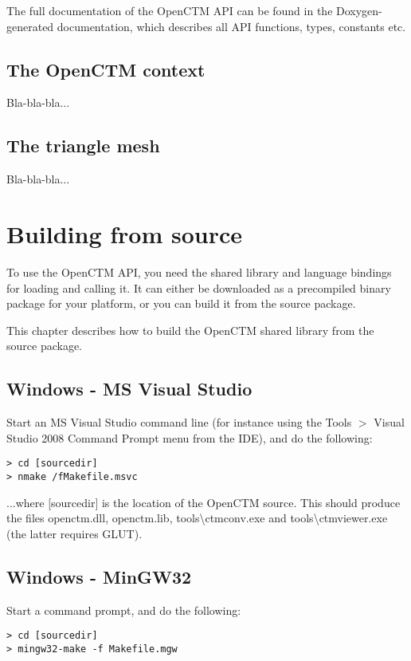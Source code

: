 The full documentation of the OpenCTM API can be found in the Doxygen-generated
documentation, which describes all API functions, types, constants etc.


\section{The OpenCTM context}
Bla-bla-bla...


\section{The triangle mesh}
Bla-bla-bla...




\chapter{Building from source}
To use the OpenCTM API, you need the shared library and language bindings
for loading and calling it. It can either be downloaded as a precompiled binary
package for your platform, or you can build it from the source package.

This chapter describes how to build the OpenCTM shared library from the source
package.

\section{Windows - MS Visual Studio}
Start an MS Visual Studio command line (for instance using the Tools $>$
Visual Studio 2008 Command Prompt menu from the IDE), and do the following:

\begin{lstlisting}
> cd [sourcedir]
> nmake /fMakefile.msvc
\end{lstlisting}

...where [sourcedir] is the location of the OpenCTM source. This should produce
the files openctm.dll, openctm.lib, tools\textbackslash ctmconv.exe and
tools\textbackslash ctmviewer.exe (the latter requires GLUT).


\section{Windows - MinGW32}
Start a command prompt, and do the following:

\begin{lstlisting}
> cd [sourcedir]
> mingw32-make -f Makefile.mgw
\end{lstlisting}


